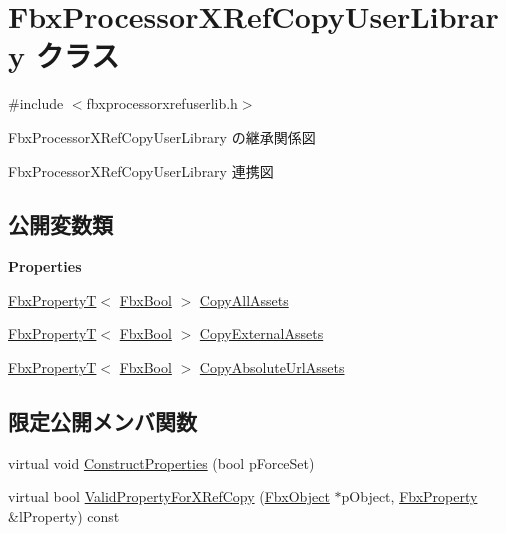 \hypertarget{class_fbx_processor_x_ref_copy_user_library}{}\section{Fbx\+Processor\+X\+Ref\+Copy\+User\+Library クラス}
\label{class_fbx_processor_x_ref_copy_user_library}


{\ttfamily \#include $<$fbxprocessorxrefuserlib.\+h$>$}



Fbx\+Processor\+X\+Ref\+Copy\+User\+Library の継承関係図


Fbx\+Processor\+X\+Ref\+Copy\+User\+Library 連携図
\subsection*{公開変数類}
\begin{Indent}\textbf{ Properties}\par
\begin{DoxyCompactItemize}
\item 
\hyperlink{class_fbx_property_t}{Fbx\+PropertyT}$<$ \hyperlink{fbxtypes_8h_a92e0562b2fe33e76a242f498b362262e}{Fbx\+Bool} $>$ \hyperlink{class_fbx_processor_x_ref_copy_user_library_aa10de06980a40ae19f01a4407fbd6b9a}{Copy\+All\+Assets}
\item 
\hyperlink{class_fbx_property_t}{Fbx\+PropertyT}$<$ \hyperlink{fbxtypes_8h_a92e0562b2fe33e76a242f498b362262e}{Fbx\+Bool} $>$ \hyperlink{class_fbx_processor_x_ref_copy_user_library_a06e90ca77b70e7241dd57981c30c5836}{Copy\+External\+Assets}
\item 
\hyperlink{class_fbx_property_t}{Fbx\+PropertyT}$<$ \hyperlink{fbxtypes_8h_a92e0562b2fe33e76a242f498b362262e}{Fbx\+Bool} $>$ \hyperlink{class_fbx_processor_x_ref_copy_user_library_a8adc7c6c058547ca3ec8ea4e3589f25e}{Copy\+Absolute\+Url\+Assets}
\end{DoxyCompactItemize}
\end{Indent}
\subsection*{限定公開メンバ関数}
\begin{DoxyCompactItemize}
\item 
virtual void \hyperlink{class_fbx_processor_x_ref_copy_user_library_a52eeb515bf8df31ec5d098697fe494b3}{Construct\+Properties} (bool p\+Force\+Set)
\item 
virtual bool \hyperlink{class_fbx_processor_x_ref_copy_user_library_a65545232dad661700a6c43e90530b3a6}{Valid\+Property\+For\+X\+Ref\+Copy} (\hyperlink{class_fbx_object}{Fbx\+Object} $\ast$p\+Object, \hyperlink{class_fbx_property}{Fbx\+Property} \&l\+Property) const
\end{DoxyCompactItemize}
